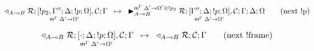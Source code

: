 \begin{align}
\trans{\contstate{A \lolli B}{\rulestk}{\pframe{\bang p_2,
   \Gamma''}{\Delta}{\bang p}{\Omega}{\Delta'}{\Omega'}, \lstack{C}}{\Gamma}}
{
   \matstate{A \lolli B}{\rulestk}{\pframe{\Gamma''}{\Delta}{\bang
      p}{\Omega}{\Delta'}{\Omega'}, \lstack{C}}{\Gamma}{\Delta}{\Omega}{\Delta'
         \rightarrow \Omega' \otimes \bang p_2}}
         \tag{next \bang p}
\end{align}

\begin{align}
\trans{\contstate{A \lolli B}{\rulestk}{\pframe{\cdot}{\Delta}{\bang
   p}{\Omega}{\Delta'}{\Omega'}, \lstack{C}}{\Gamma}}
{
   \contstate{A \lolli B}{\rulestk}{\lstack{C}}{\Gamma}}
   \tag{next \bang frame}
\end{align}
